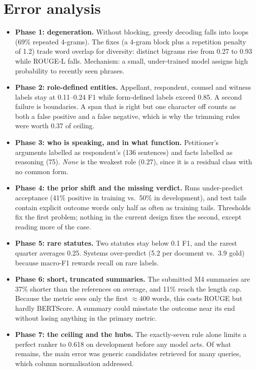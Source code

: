 \documentclass[11pt, oneside]{article}
\begin{document}
\section{Error analysis}\label{sec:errors}
\begin{itemize}[leftmargin=*, itemsep=2pt]
\item \textbf{Phase 1: degeneration.} Without blocking, greedy decoding falls into loops (69\% repeated 4-grams). The
fixes (a 4-gram block plus a repetition penalty of 1.2) trade word overlap for diversity: distinct bigrams rise from
0.27 to 0.93 while ROUGE-L falls. Mechanism: a small, under-trained model assigns high probability to recently seen
phrases.
\item \textbf{Phase 2: role-defined entities.} Appellant, respondent, counsel and witness labels stay at 0.11--0.24 F1
while form-defined labels exceed 0.85. A second failure is boundaries. A span that is right but one character off
counts as both a false positive and a false negative, which is why the trimming rules were worth 0.37 of ceiling.
\item \textbf{Phase 3: who is speaking, and in what function.} Petitioner's arguments labelled as respondent's
(136 sentences) and facts labelled as reasoning (75). \emph{None} is the weakest role (0.27), since it is a residual
class with no common form.
\item \textbf{Phase 4: the prior shift and the missing verdict.} Runs under-predict acceptance (41\% positive in
training vs.\ 50\% in development), and test tails contain explicit outcome words only half as often as training
tails. Thresholds fix the first problem; nothing in the current design fixes the second, except reading more of the
case.
\item \textbf{Phase 5: rare statutes.} Two statutes stay below 0.1 F1, and the rarest quarter averages 0.25. Systems
over-predict (5.2 per document vs.\ 3.9 gold) because macro-F1 rewards recall on rare labels.
\item \textbf{Phase 6: short, truncated summaries.} The submitted M4 summaries are 37\% shorter than the references
on average, and 11\% reach the length cap. Because the metric sees only the first $\approx$400 words, this costs ROUGE but hardly BERTScore. A summary
could misstate the outcome near its end without losing anything in the primary metric.
\item \textbf{Phase 7: the ceiling and the hubs.} The exactly-seven rule alone limits a perfect ranker to 0.618 on
development before any model acts. Of what remains, the main error was generic candidates retrieved for many queries, which column
normalisation addressed.
\end{itemize}
\end{document}
